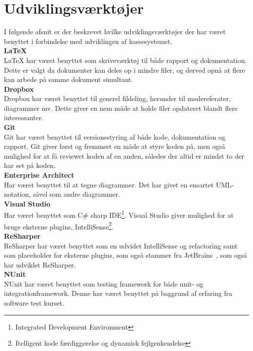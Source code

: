 \section{Udviklingsværktøjer}
I følgende afsnit er der beskrevet hvilke udviklingsværktøjer der har været benyttet i forbindelse med udviklingen af kassesystemet.\\

\textbf{LaTeX}\\
LaTeX har været benyttet som skriveværktøj til både rapport og dokumentation. Dette er valgt da dokumenter kan deles op i mindre filer, og derved opnå at flere kan arbede på samme dokument simultant. \\

\textbf{Dropbox}\\
Dropbox har været benyttet til generel fildeling, herunder til mødereferater, diagrammer mv. Dette giver en nem måde at holde filer opdateret blandt flere interessanter. \\

\textbf{Git}\\
Git har været benyttet til versionsstyring af både kode, dokumentation og rapport. Git giver først og fremmest en måde at styre koden på, men også mulighed for at få reviewet koden af en anden, således der altid er mindst to der har set på koden.\\

\textbf{Enterprise Architect}~\cite{EA}\\
Har været benyttet til at tegne diagrammer. Det har givet en ensartet UML-notation, såvel som andre diagrammer.\\


\textbf{Visual Studio}\\
Har været benyttet som C\# sharp IDE\footnote{Integrated Development Environment}. Visual Studio giver mulighed for at bruge eksterne plugins, IntelliSense\footnote{Itelligent kode færdiggørelse og dynamisk fejlgenkendelse}.\\

\textbf{ReSharper}~\cite{ReSharper}\\
ReSharper har været benyttet som en udvidet IntelliSense og refactoring samt som placeholder for eksterne plugins, som også stammer fra JetBrains~\cite{JetBrains}, som også har udviklet ReSharper.\\

\textbf{NUnit}~\cite{NUnit}\\
NUnit har været benyttet som testing framework for både unit- og integrationframework. Denne har været benyttet på baggrund af erfaring fra software test kurset.\\

